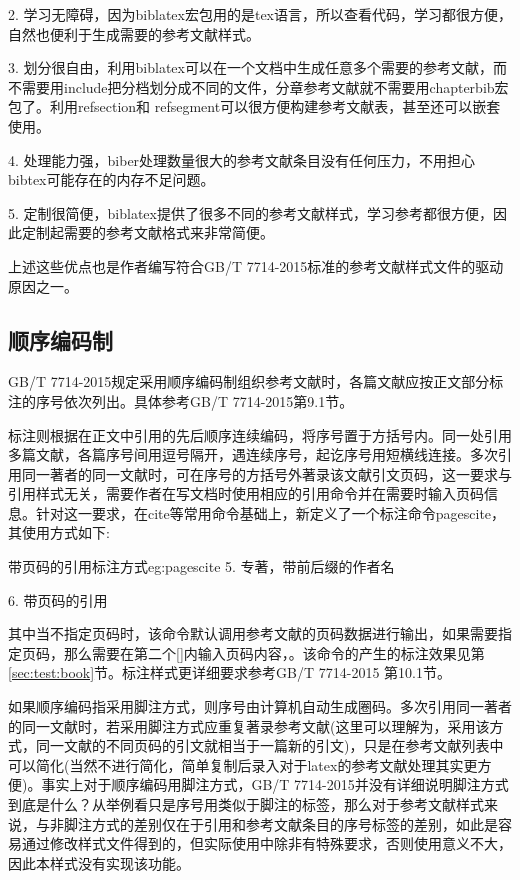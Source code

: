 \documentclass[11pt]{article} %
\begin{document}
2. 学习无障碍，因为biblatex宏包用的是tex语言，所以查看代码，学习都很方便，自然也便利于生成需要的参考文献样式。

3. 划分很自由，利用biblatex可以在一个文档中生成任意多个需要的参考文献，而不需要用include把分档划分成不同的文件，分章参考文献就不需要用chapterbib宏包了。利用refsection和 refsegment可以很方便构建参考文献表，甚至还可以嵌套使用。

4. 处理能力强，biber处理数量很大的参考文献条目没有任何压力，不用担心bibtex可能存在的内存不足问题。

5. 定制很简便，biblatex提供了很多不同的参考文献样式，学习参考都很方便，因此定制起需要的参考文献格式来非常简便。

上述这些优点也是作者编写符合GB/T 7714-2015标准的参考文献样式文件的驱动原因之一。

\subsection{顺序编码制}

GB/T 7714-2015规定采用顺序编码制组织参考文献时，各篇文献应按正文部分标注的序号依次列出。具体参考GB/T 7714-2015第9.1节。

标注则根据在正文中引用的先后顺序连续编码，将序号置于方括号内。同一处引用多篇文献，各篇序号间用逗号隔开，遇连续序号，起讫序号用短横线连接。多次引用同一著者的同一文献时，可在序号的方括号外著录该文献引文页码，这一要求与引用样式无关，需要作者在写文档时使用相应的引用命令并在需要时输入页码信息。针对这一要求，在cite等常用命令基础上，新定义了一个标注命令pagescite，其使用方式如下:

\begin{codetex}{带页码的引用标注方式}{eg:pagescite}
5. 专著，带前后缀的作者名\cite{Peebles2001-100-100}

6. 带页码的引用
\end{codetex}

其中当不指定页码时，该命令默认调用参考文献的页码数据进行输出，如果需要指定页码，那么需要在第二个[]内输入页码内容，。该命令的产生的标注效果见第\ref{sec:test:book}节。标注样式更详细要求参考GB/T 7714-2015 第10.1节。

如果顺序编码指采用脚注方式，则序号由计算机自动生成圈码。多次引用同一著者的同一文献时，若采用脚注方式应重复著录参考文献(这里可以理解为，采用该方式，同一文献的不同页码的引文就相当于一篇新的引文)，只是在参考文献列表中可以简化(当然不进行简化，简单复制后录入对于latex的参考文献处理其实更方便)。事实上对于顺序编码用脚注方式，GB/T 7714-2015并没有详细说明脚注方式到底是什么？从举例看只是序号用类似于脚注的标签，那么对于参考文献样式来说，与非脚注方式的差别仅在于引用和参考文献条目的序号标签的差别，如此是容易通过修改样式文件得到的，但实际使用中除非有特殊要求，否则使用意义不大，因此本样式没有实现该功能。
\end{document}

